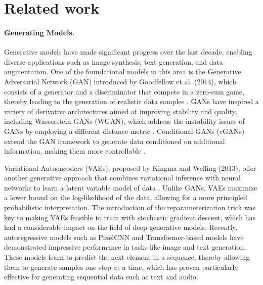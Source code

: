 \section{Related work}
\label{sec:related_work}

\paragraph{Generating Models.}
Generative models have made significant progress over the last decade, enabling diverse applications such as image synthesis, text generation, and data augmentation. One of the foundational models in this area is the Generative Adversarial Network (GAN) introduced by Goodfellow et al. (2014), which consists of a generator and a discriminator that compete in a zero-sum game, thereby leading to the generation of realistic data samples \cite{goodfellow2014generative}. GANs have inspired a variety of derivative architectures aimed at improving stability and quality, including Wasserstein GANs (WGAN), which address the instability issues of GANs by employing a different distance metric \cite{arjovsky2017wasserstein}. Conditional GANs (cGANs) extend the GAN framework to generate data conditioned on additional information, making them more controllable \cite{mirza2014conditional}. 

Variational Autoencoders (VAEs), proposed by Kingma and Welling (2013), offer another generative approach that combines variational inference with neural networks to learn a latent variable model of data \cite{kingma2013auto}. Unlike GANs, VAEs maximize a lower bound on the log-likelihood of the data, allowing for a more principled probabilistic interpretation. The introduction of the reparameterization trick was key to making VAEs feasible to train with stochastic gradient descent, which has had a considerable impact on the field of deep generative models. Recently, autoregressive models such as PixelCNN \cite{oord2016pixel} and Transformer-based models \cite{vaswani2017attention} have demonstrated impressive performance in tasks like image and text generation. These models learn to predict the next element in a sequence, thereby allowing them to generate samples one step at a time, which has proven particularly effective for generating sequential data such as text and audio. 

